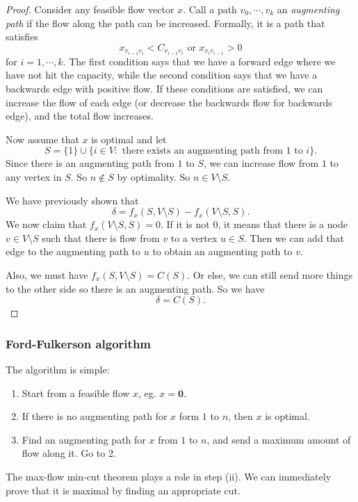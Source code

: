 \documentclass[a4paper]{article}
\begin{document}
\begin{proof}
  Consider any feasible flow vector $x$. Call a path $v_0, \cdots, v_k$ an \emph{augmenting path} if the flow along the path can be increased. Formally, it is a path that satisfies
  \[
    x_{v_{i - 1}v_i} < C_{v_{i - 1}v_i}\text{ or }x_{v_iv_{i - 1}} > 0
  \]
  for $i = 1,\cdots, k$. The first condition says that we have a forward edge where we have not hit the capacity, while the second condition says that we have a backwards edge with positive flow. If these conditions are satisfied, we can increase the flow of each edge (or decrease the backwards flow for backwards edge), and the total flow increases.

  Now assume that $x$ is optimal and let
  \[
    S = \{1\}\cup \{i\in V: \text{ there exists an augmenting path from $1$ to $i$}\}.
  \]
  Since there is an augmenting path from $1$ to $S$, we can increase flow from $1$ to any vertex in $S$. So $n \not\in S$ by optimality. So $n\in V\setminus S$.

  We have previously shown that
  \[
    \delta = f_x(S, V\setminus S) - f_x(V\setminus S, S).
  \]
  We now claim that $f_x(V\setminus S, S) = 0$. If it is not $0$, it means that there is a node $v\in V\setminus S$ such that there is flow from $v$ to a vertex $u\in S$. Then we can add that edge to the augmenting path to $u$ to obtain an augmenting path to $v$.

  Also, we must have $f_x(S, V\setminus S) = C(S)$. Or else, we can still send more things to the other side so there is an augmenting path. So we have
  \[
    \delta = C(S).
  \]
\end{proof}

\subsubsection{Ford-Fulkerson algorithm}
The algorithm is simple:
\begin{enumerate}
  \item Start from a feasible flow $x$, eg. $x = \mathbf{0}$.
  \item If there is no augmenting path for $x$ form $1$ to $n$, then $x$ is optimal.
  \item Find an augmenting path for $x$ from $1$ to $n$, and send a maximum amount of flow along it. Go to 2.
\end{enumerate}

The max-flow min-cut theorem plays a role in step (ii). We can immediately prove that it is maximal by finding an appropriate cut.
\end{document}
